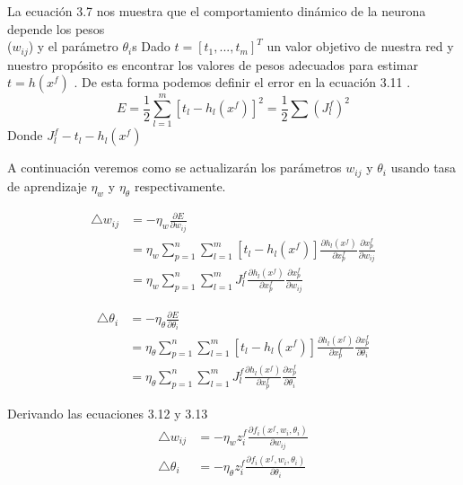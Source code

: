 La ecuación 3.7 nos muestra que el comportamiento dinámico de la neurona depende los pesos\\
 ($w_{ij}$) y el parámetro $\theta_{i}$s
Dado $t=[t_{1},...,t_{m}]^{T}$ un valor objetivo de nuestra red y nuestro propósito es encontrar los valores de pesos adecuados para estimar $ t=h(x^{f})$ . De esta forma podemos definir el error en la ecuación 3.11 .
\begin{equation}
E= \frac{1}{2} \sum_{l=1}^{m}[t_{l}-h_{l}(x^{f})]^{2}=\frac{1}{2}\sum(J_{l}^{f})^{2}
\end{equation}
Donde $J_{l}^{f}-t_{l}-h_{l}(x^{f})$ 

A continuación veremos como se actualizarán los parámetros $w_{ij}$  y $\theta_{i}$ usando tasa de aprendizaje $\eta_{w}$ y $\eta_{\theta}$ respectivamente.

\begin{equation}
	\begin{aligned}
	\bigtriangleup w_{ij}&=-\eta_{w}\frac{\partial E}{\partial w_{ij}} \\
	&=\eta_{w} \sum_{p=1}^{n} \sum_{l=1}^{m}[t_{l}-h_{l}(x^f)]\frac{\partial h_{l}(x^f)}{\partial x_{p}^f} \frac{\partial x_{p}^f}{\partial w_{ij}}\\
	&=\eta_{w} \sum_{p=1}^{n} \sum_{l=1}^{m}J_{l}^{f}\frac{\partial h_{l}(x^f)}{\partial x_{p}^f} \frac{\partial x_{p}^f}{\partial w_{ij}}
	\end{aligned}
\end{equation}

\begin{equation}
\begin{aligned}
\bigtriangleup \theta_{i}&=-\eta_{\theta}\frac{\partial E}{\partial \theta_{i}} \\
&=\eta_{\theta} \sum_{p=1}^{n} \sum_{l=1}^{m}[t_{l}-h_{l}(x^f)]\frac{\partial h_{l}(x^f)}{\partial x_{p}^f} \frac{\partial x_{p}^f}{\partial \theta_{i}}\\
&=\eta_{\theta} \sum_{p=1}^{n} \sum_{l=1}^{m}J_{l}^{f}\frac{\partial h_{l}(x^f)}{\partial x_{p}^f} \frac{\partial x_{p}^f}{\partial \theta_{i}}
\end{aligned}
\end{equation}

Derivando las ecuaciones 3.12 y 3.13
\begin{equation}
\begin{aligned}
\bigtriangleup w_{ij}&=-\eta_{w}z_{i}^f \frac{\partial f_{i}(x^f,w_{i},\theta_{i})}{\partial w_{ij}}\\
\bigtriangleup \theta_{i}&=-\eta_{\theta}z_{i}^{f}\frac{\partial f_{i}(x^f,w_{i},\theta_{i})}{\partial \theta_{i}} 
\end{aligned}
\end{equation}

